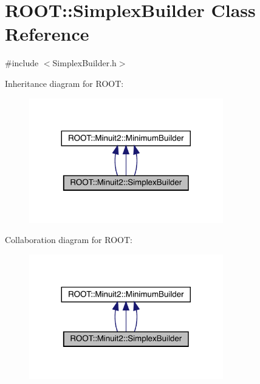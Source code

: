 \hypertarget{classROOT_1_1Minuit2_1_1SimplexBuilder}{}\section{R\+O\+OT\+:\+:Simplex\+Builder Class Reference}
\label{classROOT_1_1Minuit2_1_1SimplexBuilder}


{\ttfamily \#include $<$Simplex\+Builder.\+h$>$}



Inheritance diagram for R\+O\+OT\+:
\nopagebreak
\begin{figure}[H]
\begin{center}
\leavevmode
\includegraphics[width=239pt]{d5/d1f/classROOT_1_1Minuit2_1_1SimplexBuilder__inherit__graph}
\end{center}
\end{figure}


Collaboration diagram for R\+O\+OT\+:
\nopagebreak
\begin{figure}[H]
\begin{center}
\leavevmode
\includegraphics[width=239pt]{d1/df0/classROOT_1_1Minuit2_1_1SimplexBuilder__coll__graph}
\end{center}
\end{figure}
